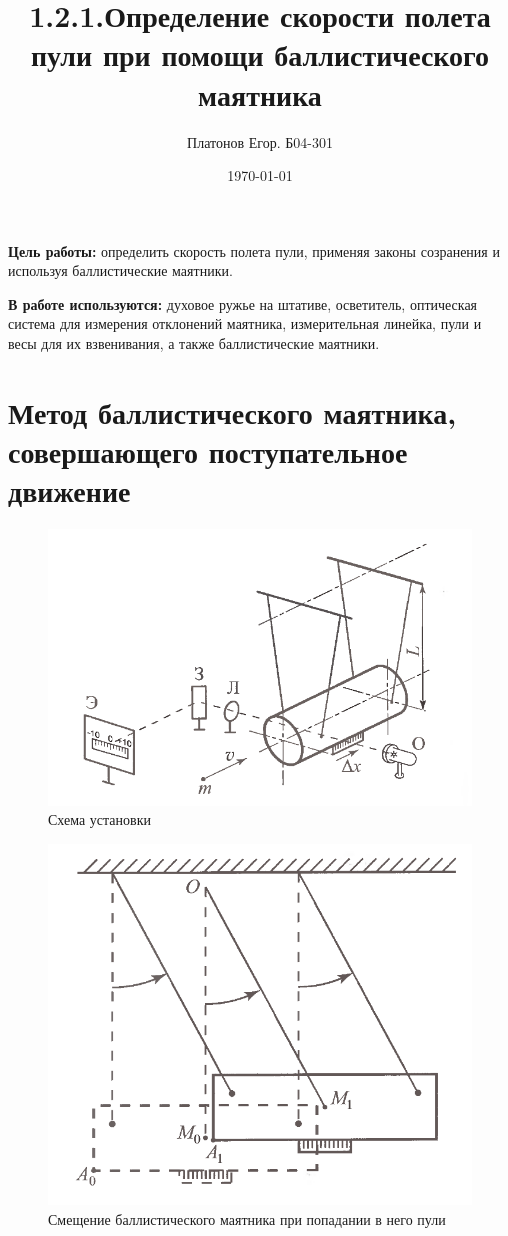\documentclass[a4paper, 12pt]{article}
\title{1.2.1.Определение скорости полета пули при помощи баллистического маятника}
\author{Платонов Егор. Б04-301}
\date{\today}
\begin{document}
\maketitle
\textbf{Цель работы:} определить скорость полета пули, применяя законы созранения и используя баллистические маятники.

\textbf{В работе используются:} духовое ружье на штативе, осветитель, оптическая система для измерения отклонений маятника, измерительная линейка, пули и весы для их взвенивания, а также баллистические маятники.

\section{Метод баллистического маятника, совершающего поступательное движение}

\begin{figure}[h]
    \centering
    \includegraphics[scale=.5]{prop-1.png}
    \caption{Схема установки}
    \label{fig:enter-label}
\end{figure}

\begin{figure}[h]
    \centering
    \includegraphics[scale=.5]{prop-2.png}
    \caption{Смещение баллистического маятника при попадании в него пули}
    \label{fig:enter-label}
\end{figure}
\end{document}
